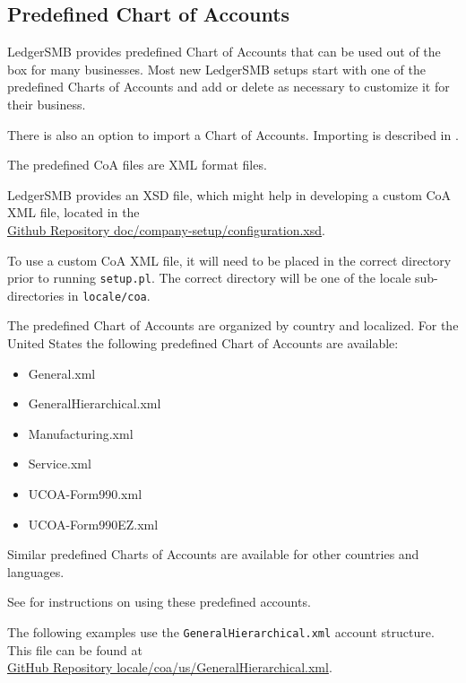 \subsection{Predefined Chart of Accounts}
\label{sec-coa-predefined}

LedgerSMB provides predefined Chart of Accounts that can be used out of the box for many businesses.
Most new LedgerSMB setups start with one of the predefined Charts of Accounts and add or delete as necessary to customize it for their business.

There is also an option to import a Chart of Accounts. Importing is described in .

The predefined \gls{CoA} files are \gls{XML} format files.

LedgerSMB provides an \gls{XSD} file, which might help in developing a custom CoA XML file,  located in the\\ \href{https://github.com/ledgersmb/LedgerSMB/blob/master/doc/company-setup/configuration.xsd}{Github Repository doc/company-setup/configuration.xsd}.  

To use a custom \gls{CoA} \gls{XML} file, it will need to be placed in the correct directory prior to running \texttt{setup.pl}. The correct directory will be one of the locale sub-directories in \texttt{locale/coa}.

The predefined Chart of Accounts are organized by country and localized. For the United States the following predefined Chart of Accounts are available:
\begin{itemize}
    \item General.xml
    \item GeneralHierarchical.xml
    \item Manufacturing.xml
    \item Service.xml
    \item UCOA-Form990.xml
    \item UCOA-Form990EZ.xml
\end{itemize}

Similar predefined Charts of Accounts are available for other countries and languages.

See  for instructions on using these predefined accounts.

The following examples use the \texttt{GeneralHierarchical.xml} account structure.
This file can be found at\\
\href{https://github.com/ledgersmb/LedgerSMB/blob/master/locale/coa/us/GeneralHierarchical.xml}{GitHub Repository locale/coa/us/GeneralHierarchical.xml}.

